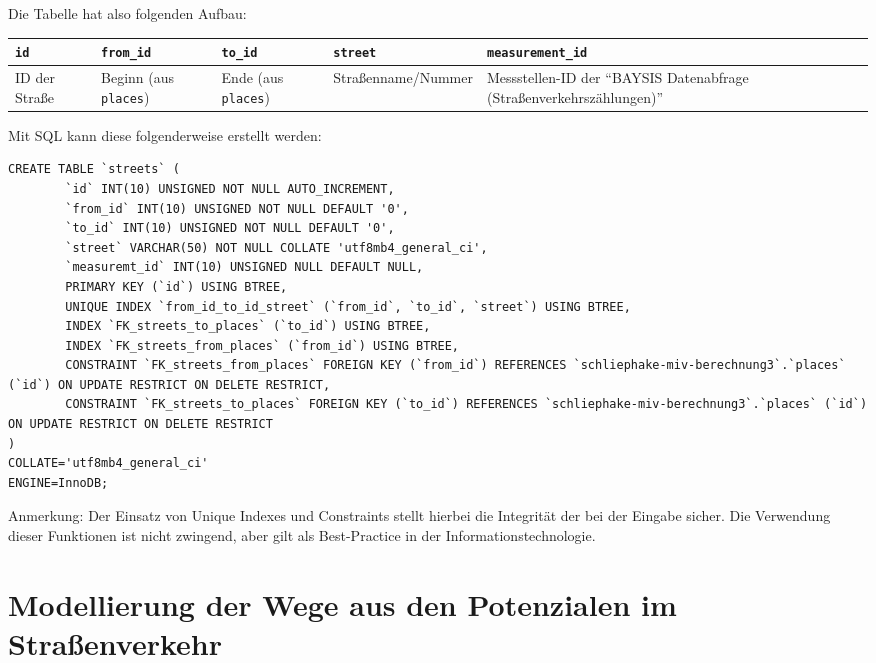 \documentclass[fontsize=12pt,a4paper]{scrreprt}
\begin{document}
Die Tabelle hat also folgenden Aufbau:

\begin{table}[H]
        \begin{tabularx}{\textwidth}{*5{|X}|}
                \hline
                \texttt{id}   & \texttt{from_id}             & \texttt{to_id}             & \texttt{street}    & \texttt{measurement_id}                                                     \\
                \hline
                ID der Straße & Beginn (aus \texttt{places}) & Ende (aus \texttt{places}) & Straßenname/Nummer & Messstellen-ID der \enquote{BAYSIS Datenabfrage (Straßenverkehrszählungen)} \\
                \hline
        \end{tabularx}
\end{table}

Mit SQL kann diese folgenderweise erstellt werden:
\begin{verbatim}
CREATE TABLE `streets` (
        `id` INT(10) UNSIGNED NOT NULL AUTO_INCREMENT,
        `from_id` INT(10) UNSIGNED NOT NULL DEFAULT '0',
        `to_id` INT(10) UNSIGNED NOT NULL DEFAULT '0',
        `street` VARCHAR(50) NOT NULL COLLATE 'utf8mb4_general_ci',
        `measuremt_id` INT(10) UNSIGNED NULL DEFAULT NULL,
        PRIMARY KEY (`id`) USING BTREE,
        UNIQUE INDEX `from_id_to_id_street` (`from_id`, `to_id`, `street`) USING BTREE,
        INDEX `FK_streets_to_places` (`to_id`) USING BTREE,
        INDEX `FK_streets_from_places` (`from_id`) USING BTREE,
        CONSTRAINT `FK_streets_from_places` FOREIGN KEY (`from_id`) REFERENCES `schliephake-miv-berechnung3`.`places` (`id`) ON UPDATE RESTRICT ON DELETE RESTRICT,
        CONSTRAINT `FK_streets_to_places` FOREIGN KEY (`to_id`) REFERENCES `schliephake-miv-berechnung3`.`places` (`id`) ON UPDATE RESTRICT ON DELETE RESTRICT
)
COLLATE='utf8mb4_general_ci'
ENGINE=InnoDB;             
\end{verbatim}

Anmerkung: Der Einsatz von Unique Indexes und Constraints stellt hierbei die Integrität der bei der Eingabe sicher. Die Verwendung dieser Funktionen ist nicht zwingend, aber gilt als Best-Practice in der Informationstechnologie.

\section{Modellierung der Wege aus den Potenzialen im Straßenverkehr}
\end{document}
